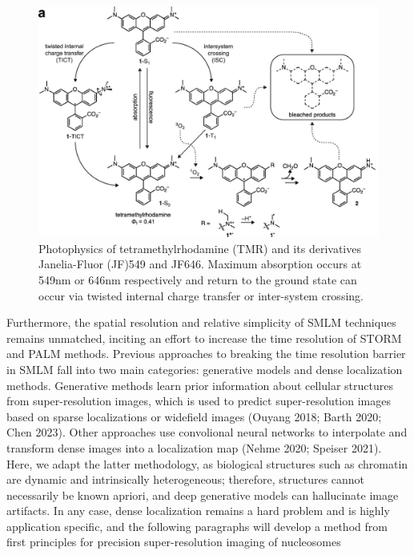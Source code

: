 \documentclass{ucetd}
\begin{document}
\begin{figure}
\begin{center}
\includegraphics[width=14cm]{Rhodamines.png}
\end{center}
\caption{Photophysics of tetramethylrhodamine (TMR) and its derivatives Janelia-Fluor (JF)549 and JF646. Maximum absorption occurs at 549nm or 646nm respectively and return to the ground state can occur via twisted internal charge transfer or inter-system crossing.}
\end{figure}


Furthermore, the spatial resolution and relative simplicity of SMLM techniques remains unmatched, inciting an effort to increase the time resolution of STORM and PALM methods. Previous approaches to breaking the time resolution barrier in SMLM fall into two main categories: generative models and dense localization methods. Generative methods learn prior information about cellular structures from super-resolution images, which is used to predict super-resolution images based on sparse localizations or widefield images (Ouyang 2018; Barth 2020; Chen 2023). Other approaches use convolional neural networks to interpolate and transform dense images into a localization map (Nehme 2020; Speiser 2021). Here, we adapt the latter methodology, as biological structures such as chromatin are dynamic and intrinsically heterogeneous; therefore, structures cannot necessarily be known apriori, and deep generative models can hallucinate image artifacts. In any case, dense localization remains a hard problem and is highly application specific, and the following paragraphs will develop a method from first principles for precision super-resolution imaging of nucleosomes
\end{document}
